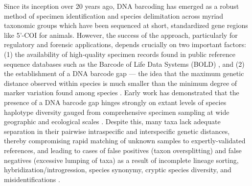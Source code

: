 \documentclass[12pt]{article}
\begin{document}
Since its inception over 20 years ago, DNA barcoding \citep{hebert2003biological, hebert2003barcoding} has emerged as a robust method of specimen identification and species delimitation across myriad \\ taxonomic groups which have been sequenced at short, standardized gene regions like 5'-COI for animals. However, the success of the approach, particularly for regulatory and forensic applications, depends crucially on two important factors: (1) the availability of high-quality specimen records found in public reference sequence databases such as the Barcode of Life Data Systems (BOLD) \citep{ratnasingham2007bold}, and (2) the establishment of a DNA barcode gap --- the idea that the maximum genetic distance observed within species is much smaller than the minimum degree of marker variation found among species \citep{meyer2005dna, meier2008use}. Early work has demonstrated that the presence of a DNA barcode gap hinges strongly on extant levels of species haplotype diversity gauged from comprehensive specimen sampling at wide geographic and ecological scales \citep{bergsten2012effect}. Despite this, many taxa lack adequate separation in their pairwise intraspecific and interspecific genetic distances, thereby compromising rapid matching of unknown samples to expertly-validated references, and leading to cases of false positives (taxon oversplitting) and false negatives (excessive lumping of taxa) as a result of incomplete lineage sorting, hybridization/introgression, species synonymy, cryptic species diversity, and \\ misidentifications \cite{hubert2015dna, phillips2022lack}.
\end{document}
